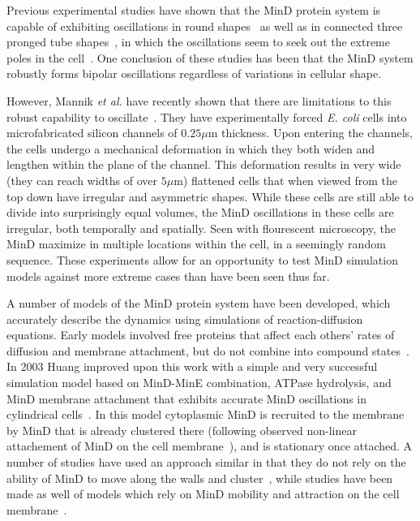 \documentclass{pnastwo}
\newcommand\micron{\ensuremath{\mu\text{m}}}
\begin{document}
\begin{article}
Previous experimental studies have shown that the MinD protein system
is capable of exhibiting oscillations in round
shapes~\cite{fange2006noise} as well as in connected three pronged
tube shapes~\cite{varma2008min}, in which the oscillations seem to
seek out the extreme poles in the
cell~\cite{juarez2010changes,corbin2002exploring}.  One conclusion of
these studies has been that the MinD system robustly forms bipolar
oscillations regardless of variations in cellular shape.

However, Mannik \emph{et al.} have recently shown that there are
limitations to this robust capability to
oscillate~\cite{mannik2010bacteria, mannik2009bacterial}. They have
experimentally forced \emph{E. coli} cells into microfabricated
silicon channels of $0.25\micron$ thickness. Upon entering the
channels, the cells undergo a mechanical deformation in which they
both widen and lengthen within the plane of the channel.  This
deformation results in very wide (they can reach widths of over
$5\micron$) flattened cells that when viewed from the top down have
irregular and asymmetric shapes.  While these cells are still able to
divide into surprisingly equal volumes, the MinD oscillations in these
cells are irregular, both temporally and spatially. Seen with
flourescent microscopy, the MinD maximize in multiple locations within
the cell, in a seemingly random sequence. These experiments allow for
an opportunity to test MinD simulation models against more extreme
cases than have been seen thus far.

A number of models of the MinD protein system have been developed,
which accurately describe the dynamics using simulations of
reaction-diffusion equations.
%
Early models involved free proteins that affect each others' rates of
diffusion and membrane attachment, but do not combine into compound
states~\cite{meinhardt2001pattern}.  In 2003 Huang improved upon this
work with a simple and very successful simulation model based on
MinD-MinE combination, ATPase hydrolysis, and MinD membrane attachment
that exhibits accurate MinD oscillations in cylindrical
cells~\cite{huang2003dynamic}. In this model cytoplasmic MinD is
recruited to the membrane by MinD that is already clustered there
(following observed non-linear attachement of MinD on the cell
membrane~\cite{hu2002dynamic,shih2002division}), and is stationary
once attached.  A number of studies have used an approach similar in
that they do not rely on the ability of MinD to move along the walls
and cluster~\cite{kruse2007experimentalist, meinhardt2001pattern,
  drew2005polymerization, fange2006noise, kerr2006division}, while
studies have been made as well of models which rely on MinD mobility
and attraction on the cell membrane~\cite{kruse2002dynamic,
  howard2005cellular}.


\end{article}
\end{document}
